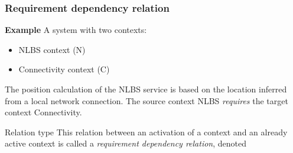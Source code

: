 \begin{frame}[noframenumbering]
	\frametitle{Requirement dependency relation}

	\textbf{Example} A system with two contexts:

	\begin{itemize}
		\item NLBS context (N)
		\item Connectivity context (C)
	\end{itemize}

	The position calculation of the NLBS service is based on the location inferred
	from a local network connection. The source context NLBS \emph{requires} the
	target context Connectivity.

	\begin{exampleblock}{Relation type}
		This relation between an activation of a context and an already active context
		is called a \emph{requirement dependency relation},
		denoted 
	\end{exampleblock}
\end{frame}
